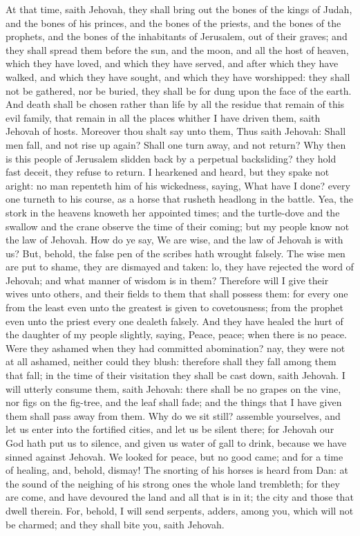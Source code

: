 At that time, saith Jehovah, they shall bring out the bones of the kings of Judah, and the bones of his princes, and the bones of the priests, and the bones of the prophets, and the bones of the inhabitants of Jerusalem, out of their graves; and they shall spread them before the sun, and the moon, and all the host of heaven, which they have loved, and which they have served, and after which they have walked, and which they have sought, and which they have worshipped: they shall not be gathered, nor be buried, they shall be for dung upon the face of the earth. And death shall be chosen rather than life by all the residue that remain of this evil family, that remain in all the places whither I have driven them, saith Jehovah of hosts.  Moreover thou shalt say unto them, Thus saith Jehovah: Shall men fall, and not rise up again? Shall one turn away, and not return? Why then is this people of Jerusalem slidden back by a perpetual backsliding? they hold fast deceit, they refuse to return. I hearkened and heard, but they spake not aright: no man repenteth him of his wickedness, saying, What have I done? every one turneth to his course, as a horse that rusheth headlong in the battle. Yea, the stork in the heavens knoweth her appointed times; and the turtle-dove and the swallow and the crane observe the time of their coming; but my people know not the law of Jehovah.  How do ye say, We are wise, and the law of Jehovah is with us? But, behold, the false pen of the scribes hath wrought falsely. The wise men are put to shame, they are dismayed and taken: lo, they have rejected the word of Jehovah; and what manner of wisdom is in them? Therefore will I give their wives unto others, and their fields to them that shall possess them: for every one from the least even unto the greatest is given to covetousness; from the prophet even unto the priest every one dealeth falsely. And they have healed the hurt of the daughter of my people slightly, saying, Peace, peace; when there is no peace. Were they ashamed when they had committed abomination? nay, they were not at all ashamed, neither could they blush: therefore shall they fall among them that fall; in the time of their visitation they shall be cast down, saith Jehovah. I will utterly consume them, saith Jehovah: there shall be no grapes on the vine, nor figs on the fig-tree, and the leaf shall fade; and the things that I have given them shall pass away from them.  Why do we sit still? assemble yourselves, and let us enter into the fortified cities, and let us be silent there; for Jehovah our God hath put us to silence, and given us water of gall to drink, because we have sinned against Jehovah. We looked for peace, but no good came; and for a time of healing, and, behold, dismay! The snorting of his horses is heard from Dan: at the sound of the neighing of his strong ones the whole land trembleth; for they are come, and have devoured the land and all that is in it; the city and those that dwell therein. For, behold, I will send serpents, adders, among you, which will not be charmed; and they shall bite you, saith Jehovah. 